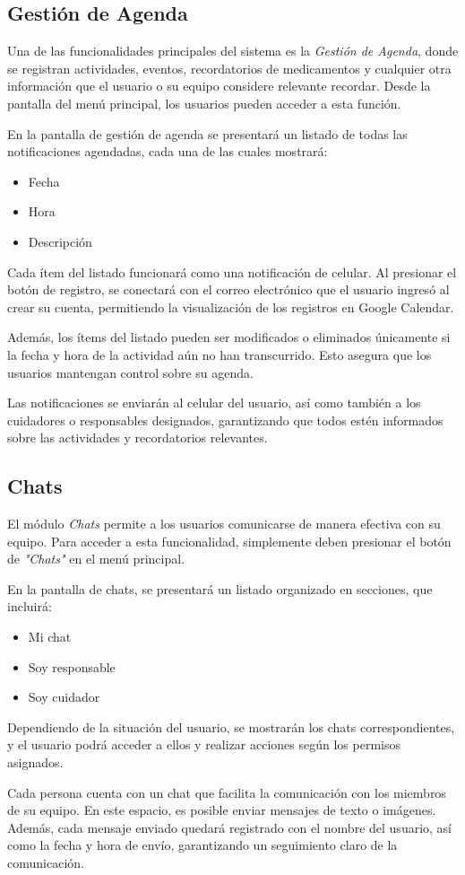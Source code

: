\documentclass[a4paper,12pt]{article}
\begin{document}
    \subsection{Gestión de Agenda}
    \par Una de las funcionalidades principales del sistema es la \textit{Gestión de Agenda}, donde se registran actividades, eventos, recordatorios de medicamentos y cualquier otra información que el usuario o su equipo considere relevante recordar. Desde la pantalla del menú principal, los usuarios pueden acceder a esta función.
    \par En la pantalla de gestión de agenda se presentará un listado de todas las notificaciones agendadas, cada una de las cuales mostrará:
    \begin{itemize}
        \item Fecha
        \item Hora
        \item Descripción
    \end{itemize}
    \par Cada ítem del listado funcionará como una notificación de celular. Al presionar el botón de registro, se conectará con el correo electrónico que el usuario ingresó al crear su cuenta, permitiendo la visualización de los registros en Google Calendar.
    \par Además, los ítems del listado pueden ser modificados o eliminados únicamente si la fecha y hora de la actividad aún no han transcurrido. Esto asegura que los usuarios mantengan control sobre su agenda.
    \par Las notificaciones se enviarán al celular del usuario, así como también a los cuidadores o responsables designados, garantizando que todos estén informados sobre las actividades y recordatorios relevantes.
    \subsection{Chats}
    \par El módulo \textit{Chats} permite a los usuarios comunicarse de manera efectiva con su equipo. Para acceder a esta funcionalidad, simplemente deben presionar el botón de \textit{"Chats"} en el menú principal.
    \par En la pantalla de chats, se presentará un listado organizado en secciones, que incluirá:
    \begin{itemize}
        \item Mi chat
        \item Soy responsable
        \item Soy cuidador
    \end{itemize}
    \par Dependiendo de la situación del usuario, se mostrarán los chats correspondientes, y el usuario podrá acceder a ellos y realizar acciones según los permisos asignados.
    \par Cada persona cuenta con un chat que facilita la comunicación con los miembros de su equipo. En este espacio, es posible enviar mensajes de texto o imágenes. Además, cada mensaje enviado quedará registrado con el nombre del usuario, así como la fecha y hora de envío, garantizando un seguimiento claro de la comunicación.
\end{document}
